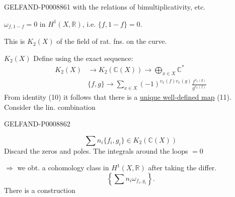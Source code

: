 \begin{GelfandAdjacentEvidence}{GELFAND-P000886}{1}
with the relations of bimultiplicativity, etc.

$\omega_{f,1-f}=0$ in $H^1(X,\mathbb R)$, i.e. $\{f,1-f\}=0$.

This is $K_2(X)$ of the field of rat. fns. on the curve.

$K_2(X)$ Define using the exact sequence:
\begin{equation*}
\begin{aligned}
K_2(X)&\to K_2(\mathbb C(X))\to\bigoplus_{x\in X}\mathbb C^*\\
&\{f,g\}\longrightarrow\sum_{x\in X}(-1)^{v_x(f)v_x(g)}\frac{f^{v_x(g)}}{g^{v_x(f)}}
\end{aligned}
\tag{12}
\end{equation*}
From identity (10) it follows that there is a \uline{unique well-defined map} (11). Consider the lin. combination

\end{GelfandAdjacentEvidence}
\begin{GelfandAdjacentEvidence}{GELFAND-P000886}{2}

\begin{equation*}
\sum n_i\{f_i,g_i\}\in K_2(\mathbb C(X))
\tag{13}
\end{equation*}
Discard the zeros and poles. The integrals around the loops $=0$

$\Rightarrow$ we obt. a cohomology class in $H^1(X,\mathbb R)$ after taking the differ.
\begin{equation*}
\left\{\sum n_i\omega_{f_i,g_i}\right\}.
\tag{14}
\end{equation*}
There is a construction

\end{GelfandAdjacentEvidence}
